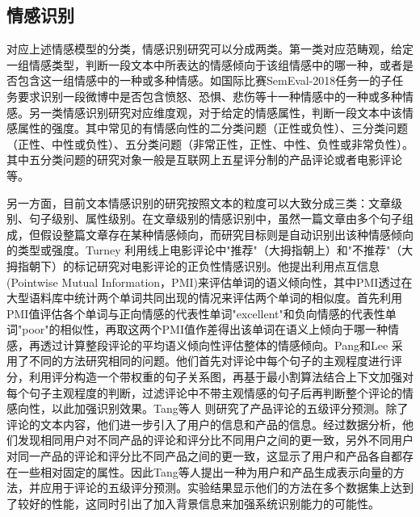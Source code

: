 \subsection{情感识别}

对应上述情感模型的分类，情感识别研究可以分成两类。第一类对应范畴观，给定一组情感类型，判断一段文本中所表达的情感倾向于该组情感中的哪一种，或者是否包含这一组情感中的一种或多种情感。如国际比赛SemEval-2018任务一\cite{mohammad2018semeval}的子任务要求识别一段微博中是否包含愤怒、恐惧、悲伤等十一种情感中的一种或多种情感。另一类情感识别研究对应维度观，对于给定的情感属性，判断一段文本中该情感属性的强度。其中常见的有情感向性的二分类问题（正性或负性）、三分类问题（正性、中性或负性）、五分类问题（非常正性，正性、中性、负性或非常负性）。其中五分类问题的研究对象一般是互联网上五星评分制的产品评论或者电影评论等。

另一方面，目前文本情感识别的研究按照文本的粒度可以大致分成三类：文章级别、句子级别、属性级别。在文章级别的情感识别中，虽然一篇文章由多个句子组成，但假设整篇文章存在某种情感倾向，而研究目标则是自动识别出该种情感倾向的类型或强度。Turney \cite{turney2002thumbs} 利用线上电影评论中"推荐"（大拇指朝上）和"不推荐"（大拇指朝下）的标记研究对电影评论的正负性情感识别。他提出利用点互信息(Pointwise Mutual Information，PMI)来评估单词的语义倾向性，其中PMI透过在大型语料库中统计两个单词共同出现的情况来评估两个单词的相似度。首先利用PMI值评估各个单词与正向情感的代表性单词"excellent"和负向情感的代表性单词"poor"的相似性，再取这两个PMI值作差得出该单词在语义上倾向于哪一种情感，再透过计算整段评论的平均语义倾向性评估整体的情感倾向。Pang和Lee \cite{pang2004sentimental} 采用了不同的方法研究相同的问题。他们首先对评论中每个句子的主观程度进行评分，利用评分构造一个带权重的句子关系图，再基于最小割算法结合上下文加强对每个句子主观程度的判断，过滤评论中不带主观情感的句子后再判断整个评论的情感向性，以此加强识别效果。Tang等人 \cite{tang2015learning} 则研究了产品评论的五级评分预测。除了评论的文本内容，他们进一步引入了用户的信息和产品的信息。经过数据分析，他们发现相同用户对不同产品的评论和评分比不同用户之间的更一致，另外不同用户对同一产品的评论和评分比不同产品之间的更一致，这显示了用户和产品各自都存在一些相对固定的属性。因此Tang等人提出一种为用户和产品生成表示向量的方法，并应用于评论的五级评分预测。实验结果显示他们的方法在多个数据集上达到了较好的性能，这同时引出了加入背景信息来加强系统识别能力的可能性。

